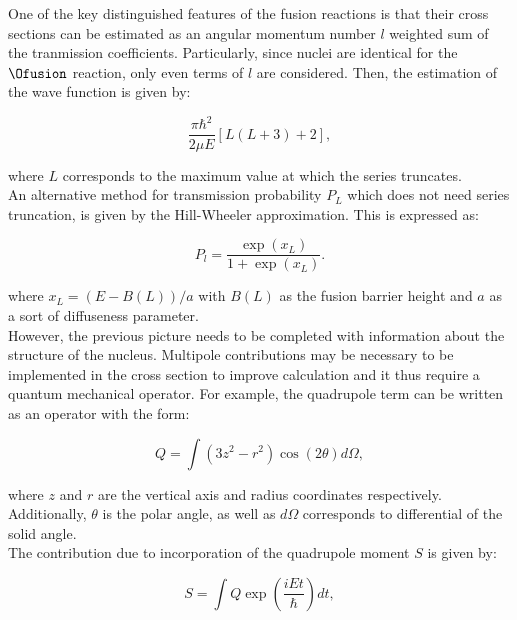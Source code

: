 \documentclass[openany]{book}
\begin{document}
One of the key distinguished features of the fusion reactions is that their cross sections can be estimated as an angular momentum number $l$ weighted sum of the tranmission coefficients. Particularly, since nuclei are identical for the $\Ofusion$ reaction, only even terms of $l$ are considered. Then, the estimation of the wave function is given by: 

\begin{equation}
	\frac{\pi\hbar^2}{2\mu E}  [L (L + 3 ) + 2],
\end{equation}

where $L$ corresponds to the maximum value at which the series truncates. \\

An alternative method for transmission probability $P_L$ which does not need series truncation, is given by the Hill-Wheeler approximation. This is expressed as: 

\begin{equation} \label{micro_TDHF_fusion_crossSectionEven}
	P_l = \frac{\exp {(x_L)}}{1 + \exp {(x_L)}}.
\end{equation}

where $x_L = (E - B(L))/a$ with $B(L)$ as the fusion barrier height and $a$ as a sort of diffuseness parameter.  \\

However, the previous picture needs to be completed with information about the structure of the nucleus. Multipole contributions may be necessary to be implemented in the cross section to improve calculation and it thus require a quantum mechanical operator. For example,  the quadrupole term can be written as an operator with the form:

\begin{equation}\label{micro_TDHF_quadrupole}
	Q = \int (3z^2 - r^2) \cos (2\theta) d\Omega,
\end{equation}

where $z$ and $r$ are the vertical axis and radius coordinates respectively. Additionally, $\theta$ is the polar angle, as well as $d\Omega$ corresponds to differential of the solid angle.  \\

The contribution due to incorporation of the quadrupole moment $S$ is given by:

\begin{equation}\label{micro_TDHF_quadrupole_calculation}
	S = \int Q  \exp{\left( \frac{iEt}{\hbar }\right)}dt, 
\end{equation}
\end{document}
